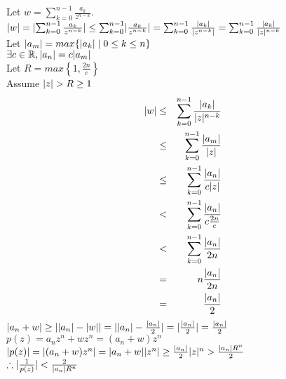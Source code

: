 \documentclass[letterpaper,12pt,fleqn]{article}
\begin{document}
\begin{theproof}
Let $w=\sum_{k=0}^{n-1}\frac{a_k}{z^{n-k}}$. \\
$\lvert w\rvert=\lvert\sum_{k=0}^{n-1}\frac{a_k}{z^{n-k}}\rvert\le
    \sum_{k=0}^{n-1}\lvert\frac{a_k}{z^{n-k}}\rvert=
    \sum_{k=0}^{n-1}\frac{\lvert a_k\rvert}{\lvert z^{n-k}\rvert}=
    \sum_{k=0}^{n-1}\frac{\lvert a_k\rvert}{\lvert z\rvert^{n-k}}$ \\
Let $\lvert a_m\rvert=max\{\lvert a_k\rvert\mid0\le k\le n\}$ \\
$\exists c\in\mathbb{R},\lvert a_n\rvert=c\lvert a_m\rvert$ \\
Let $R=max\left\{1,\frac{2n}{c}\right\}$ \\
Assume $\lvert z\rvert>R\ge1$ \\
\begin{eqnarray*}
\lvert w\rvert &\le& \sum_{k=0}^{n-1}\frac{\lvert a_k\rvert}{\lvert z\rvert^{n-k}} \\
    &\le& \sum_{k=0}^{n-1}\frac{\lvert a_m\rvert}{\lvert z\rvert} \\
    &\le& \sum_{k=0}^{n-1}\frac{\lvert a_n\rvert}{c\lvert z\rvert} \\
    &<& \sum_{k=0}^{n-1}\frac{\lvert a_n\rvert}{c\frac{2n}{c}} \\
    &<& \sum_{k=0}^{n-1}\frac{\lvert a_n\rvert}{2n} \\
    &=& n\frac{\lvert a_n\rvert}{2n} \\
    &=& \frac{\lvert a_n\rvert}{2} \\
\end{eqnarray*}
$\lvert a_n+w\rvert\ge\lvert\lvert a_n\rvert-\lvert w\rvert\rvert=\lvert\lvert a_n\rvert-\frac{\lvert a_n\rvert}{2}\rvert=
    \lvert\frac{\lvert a_n\rvert}{2}\rvert=\frac{\lvert a_n\rvert}{2}$ \\
$p(z)=a_nz^n+wz^n=(a_n+w)z^n$ \\
$\lvert p(z)\rvert=\lvert(a_n+w)z^n\rvert=\lvert a_n+w\rvert\lvert z^n\rvert\ge
    \frac{\lvert a_n\rvert}{2}\lvert z\rvert^n>\frac{\lvert a_n\rvert R^n}{2}$ \\
$\therefore \lvert\frac{1}{p(z)}\rvert<\frac{2}{\lvert a_n\rvert R^n}$
\end{theproof}
\end{document}
